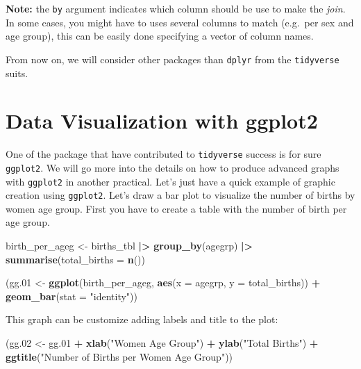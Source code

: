 \documentclass[
]{book}
\newenvironment{Shaded}{\begin{snugshade}}{\end{snugshade}}
\newcommand{\AttributeTok}[1]{\textcolor[rgb]{0.13,0.29,0.53}{#1}}
\newcommand{\FloatTok}[1]{\textcolor[rgb]{0.00,0.00,0.81}{#1}}
\newcommand{\FunctionTok}[1]{\textcolor[rgb]{0.13,0.29,0.53}{\textbf{#1}}}
\newcommand{\NormalTok}[1]{#1}
\newcommand{\OtherTok}[1]{\textcolor[rgb]{0.56,0.35,0.01}{#1}}
\newcommand{\SpecialCharTok}[1]{\textcolor[rgb]{0.81,0.36,0.00}{\textbf{#1}}}
\newcommand{\StringTok}[1]{\textcolor[rgb]{0.31,0.60,0.02}{#1}}
\begin{document}
\textbf{Note:} the \texttt{by} argument indicates which column should be use to make the \emph{join}. In some
cases, you might have to uses several columns to match (e.g.~per sex and age group), this
can be easily done specifying a vector of column names.

From now on, we will consider other packages than \texttt{dplyr} from the \texttt{tidyverse} suits.

\section{Data Visualization with ggplot2}\label{data-visualization-with-ggplot2}

One of the package that have contributed to \texttt{tidyverse} success is for sure \texttt{ggplot2}.
We will go more into the details on how to produce advanced graphs with \texttt{ggplot2} in another practical.
Let's just have a quick example of graphic creation using \texttt{ggplot2}.
Let's draw a bar plot to visualize the number of births by women age group.
First you have to create a table with the number of birth per age group.

\begin{Shaded}
\begin{Highlighting}[]
\NormalTok{birth\_per\_ageg }\OtherTok{\textless{}{-}}\NormalTok{ births\_tbl }\SpecialCharTok{|\textgreater{}}
  \FunctionTok{group\_by}\NormalTok{(agegrp) }\SpecialCharTok{|\textgreater{}}
  \FunctionTok{summarise}\NormalTok{(}\AttributeTok{total\_births =} \FunctionTok{n}\NormalTok{())}
\end{Highlighting}
\end{Shaded}

\begin{Shaded}
\begin{Highlighting}[]
\NormalTok{(gg}\FloatTok{.01} \OtherTok{\textless{}{-}}
  \FunctionTok{ggplot}\NormalTok{(birth\_per\_ageg, }\FunctionTok{aes}\NormalTok{(}\AttributeTok{x =}\NormalTok{ agegrp, }\AttributeTok{y =}\NormalTok{ total\_births)) }\SpecialCharTok{+}
  \FunctionTok{geom\_bar}\NormalTok{(}\AttributeTok{stat =} \StringTok{"identity"}\NormalTok{))}
\end{Highlighting}
\end{Shaded}

This graph can be customize adding labels and title to the plot:

\begin{Shaded}
\begin{Highlighting}[]
\NormalTok{(gg}\FloatTok{.02} \OtherTok{\textless{}{-}}
\NormalTok{  gg}\FloatTok{.01} \SpecialCharTok{+}
  \FunctionTok{xlab}\NormalTok{(}\StringTok{"Women Age Group"}\NormalTok{) }\SpecialCharTok{+}
  \FunctionTok{ylab}\NormalTok{(}\StringTok{"Total Births"}\NormalTok{) }\SpecialCharTok{+}
  \FunctionTok{ggtitle}\NormalTok{(}\StringTok{"Number of Births per Women Age Group"}\NormalTok{))}
\end{Highlighting}
\end{Shaded}
\end{document}
